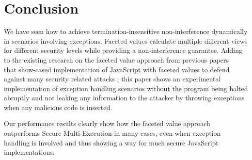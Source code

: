 \chapter{Conclusion}

We have seen how to achieve termination-insensitive non-interference dynamically in scenarios involving exceptions. Faceted values calculate multiple different views for different security levels while providing a non-interference guarantee. Adding to the existing research on the faceted value approach from previous papers ~\cite{bib3, bib4} that show-cased implementation of JavaScript with faceted values to defend against many security related attacks , this paper shows an experimental implementation of exception handling scenarios without the program being halted abruptly and not leaking any information to the attacker by throwing exceptions when any malicious code is inserted. 

Our performance results clearly show how the faceted value approach outperforms Secure Multi-Execution in many cases, even when exception handling is involved and thus showing a way for much secure JavaScript implementations.




